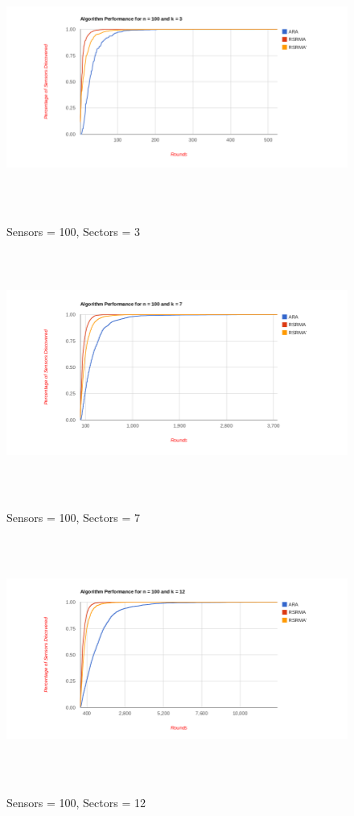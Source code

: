 \begin{figure}[ht]
\caption{Sensors = 100, Sectors = 3}
\includegraphics[height = 8cm]{pics/graph100k3.png}\\[0.5cm]    
\label{fig:n100k3}
\end{figure}

\begin{figure}[ht]
\caption{Sensors = 100, Sectors = 7}
\includegraphics[height = 8cm]{pics/graph100k7.png}\\[0.5cm]   
\label{fig:n100k7} 
\end{figure}

\begin{figure}[ht]
\caption{Sensors = 100, Sectors = 12}
\includegraphics[height = 8cm]{pics/graph100k12.png}\\[0.5cm] 
\label{fig:n100k12}   
\end{figure}


